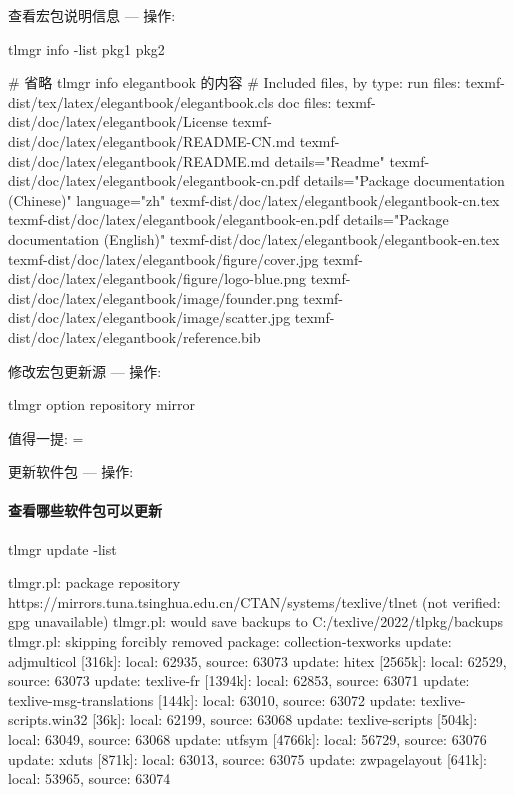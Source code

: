 \begin{frame}[fragile]{查看宏包说明信息 --- 操作: }

\begin{cmdcode}
tlmgr info -list pkg1 pkg2
\end{cmdcode}
\begin{outputcode}
# 省略 tlmgr info elegantbook 的内容 #
Included files, by type:
run files:
  texmf-dist/tex/latex/elegantbook/elegantbook.cls
doc files:
  texmf-dist/doc/latex/elegantbook/License
  texmf-dist/doc/latex/elegantbook/README-CN.md
  texmf-dist/doc/latex/elegantbook/README.md details="Readme"
  texmf-dist/doc/latex/elegantbook/elegantbook-cn.pdf details="Package documentation (Chinese)" language="zh"
  texmf-dist/doc/latex/elegantbook/elegantbook-cn.tex
  texmf-dist/doc/latex/elegantbook/elegantbook-en.pdf details="Package documentation (English)"
  texmf-dist/doc/latex/elegantbook/elegantbook-en.tex
  texmf-dist/doc/latex/elegantbook/figure/cover.jpg
  texmf-dist/doc/latex/elegantbook/figure/logo-blue.png
  texmf-dist/doc/latex/elegantbook/image/founder.png
  texmf-dist/doc/latex/elegantbook/image/scatter.jpg
  texmf-dist/doc/latex/elegantbook/reference.bib
\end{outputcode}
\end{frame}


\begin{frame}[fragile]{修改宏包更新源 --- 操作: }

\begin{cmdcode}
tlmgr option repository mirror
\end{cmdcode}

值得一提:  = 
\end{frame}

\begin{frame}[fragile]{更新软件包 --- 操作: }
\framesubtitle{查看哪些软件包可以更新}

\begin{cmdcode}
tlmgr update -list
\end{cmdcode}
\begin{outputcode}
tlmgr.pl: package repository https://mirrors.tuna.tsinghua.edu.cn/CTAN/systems/texlive/tlnet (not verified: gpg unavailable)
tlmgr.pl: would save backups to C:/texlive/2022/tlpkg/backups
tlmgr.pl: skipping forcibly removed package: collection-texworks
update:   adjmulticol   [316k]: local:  62935, source:  63073
update:   hitex         [2565k]: local:  62529, source:  63073
update:   texlive-fr    [1394k]: local:  62853, source:  63071
update:   texlive-msg-translations [144k]: local:  63010, source:  63072
update:   texlive-scripts.win32 [36k]: local:  62199, source:  63068
update:   texlive-scripts [504k]: local:  63049, source:  63068
update:   utfsym         [4766k]: local:  56729, source:  63076
update:   xduts          [871k]: local:  63013, source:  63075
update:   zwpagelayout   [641k]: local:  53965, source:  63074  
\end{outputcode}
\end{frame}


